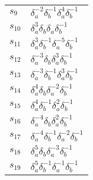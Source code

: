 \documentclass{article}
\begin{document}
\begin{center}
\begin{tabular}{ll}
$s_{9}$ & $\delta_a^{-2}\delta_b^{-1}\delta_a^{4}\delta_b^{-1}$ \\
$s_{10}$ & $\delta_a^{3}\delta_b^{}\delta_a^{}\delta_b^{-1}$ \\
$s_{11}$ & $\delta_a^{3}\delta_b^{-1}\delta_a^{-5}\delta_b^{-1}$ \\
$s_{12}$ & $\delta_a^{-3}\delta_b^{}\delta_a^{3}\delta_b^{-1}$ \\
$s_{13}$ & $\delta_a^{-3}\delta_b^{-1}\delta_a^{3}\delta_b^{-1}$ \\
$s_{14}$ & $\delta_a^{4}\delta_b^{}\delta_a^{-2}\delta_b^{-1}$ \\
$s_{15}$ & $\delta_a^{4}\delta_b^{-1}\delta_a^{2}\delta_b^{-1}$ \\
$s_{16}$ & $\delta_a^{-4}\delta_b^{}\delta_a^{2}\delta_b^{-1}$ \\
$s_{17}$ & $\delta_a^{-4}\delta_b^{-1}\delta_a^{-2}\delta_b^{-1}$ \\
$s_{18}$ & $\delta_a^{5}\delta_b^{}\delta_a^{-3}\delta_b^{-1}$ \\
$s_{19}$ & $\delta_a^{5}\delta_b^{-1}\delta_a^{-1}\delta_b^{-1}$ \\
\bottomrule
\end{tabular}
\end{center}

\thispagestyle{empty}
\end{document}
